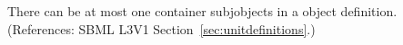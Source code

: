 There can be at most one \ListOfUnits container subjobjects in a
\UnitDefinition object definition.  (References: SBML L3V1
Section~\ref{sec:unitdefinitions}.)
